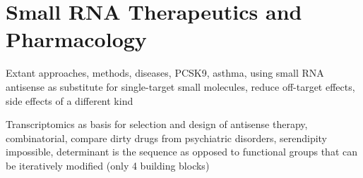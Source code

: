 \section{Small RNA Therapeutics and Pharmacology} \label{sec:discussion:therapy}
Extant approaches, methods, diseases, PCSK9, asthma, using small RNA antisense as substitute for single-target small molecules, reduce off-target effects, side effects of a different kind

Transcriptomics as basis for selection and design of antisense therapy, combinatorial, compare dirty drugs from psychiatric disorders, serendipity impossible, determinant is the sequence as opposed to functional groups that can be iteratively modified (only 4 building blocks)
